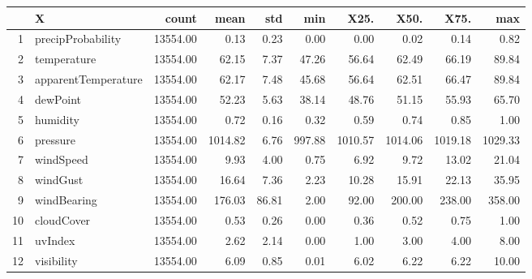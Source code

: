 \begin{table}[ht]
\centering
\begin{tabular}{rlrrrrrrrr}
  \hline
 & X & count & mean & std & min & X25. & X50. & X75. & max \\ 
  \hline
1 & precipProbability & 13554.00 & 0.13 & 0.23 & 0.00 & 0.00 & 0.02 & 0.14 & 0.82 \\ 
  2 & temperature & 13554.00 & 62.15 & 7.37 & 47.26 & 56.64 & 62.49 & 66.19 & 89.84 \\ 
  3 & apparentTemperature & 13554.00 & 62.17 & 7.48 & 45.68 & 56.64 & 62.51 & 66.47 & 89.84 \\ 
  4 & dewPoint & 13554.00 & 52.23 & 5.63 & 38.14 & 48.76 & 51.15 & 55.93 & 65.70 \\ 
  5 & humidity & 13554.00 & 0.72 & 0.16 & 0.32 & 0.59 & 0.74 & 0.85 & 1.00 \\ 
  6 & pressure & 13554.00 & 1014.82 & 6.76 & 997.88 & 1010.57 & 1014.06 & 1019.18 & 1029.33 \\ 
  7 & windSpeed & 13554.00 & 9.93 & 4.00 & 0.75 & 6.92 & 9.72 & 13.02 & 21.04 \\ 
  8 & windGust & 13554.00 & 16.64 & 7.36 & 2.23 & 10.28 & 15.91 & 22.13 & 35.95 \\ 
  9 & windBearing & 13554.00 & 176.03 & 86.81 & 2.00 & 92.00 & 200.00 & 238.00 & 358.00 \\ 
  10 & cloudCover & 13554.00 & 0.53 & 0.26 & 0.00 & 0.36 & 0.52 & 0.75 & 1.00 \\ 
  11 & uvIndex & 13554.00 & 2.62 & 2.14 & 0.00 & 1.00 & 3.00 & 4.00 & 8.00 \\ 
  12 & visibility & 13554.00 & 6.09 & 0.85 & 0.01 & 6.02 & 6.22 & 6.22 & 10.00 \\ 
   \hline
\end{tabular}
\end{table}
